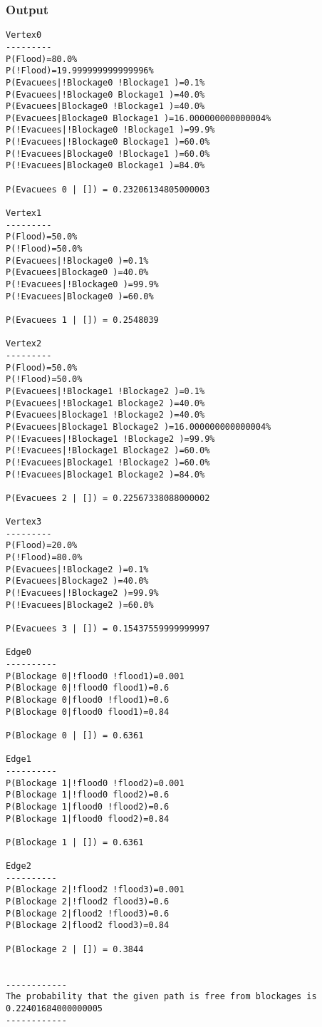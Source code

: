 \documentclass{article}                     %
\begin{document}
\subsubsection{Output}
\begin{verbatim}
Vertex0
---------
P(Flood)=80.0%
P(!Flood)=19.999999999999996%
P(Evacuees|!Blockage0 !Blockage1 )=0.1%
P(Evacuees|!Blockage0 Blockage1 )=40.0%
P(Evacuees|Blockage0 !Blockage1 )=40.0%
P(Evacuees|Blockage0 Blockage1 )=16.000000000000004%
P(!Evacuees|!Blockage0 !Blockage1 )=99.9%
P(!Evacuees|!Blockage0 Blockage1 )=60.0%
P(!Evacuees|Blockage0 !Blockage1 )=60.0%
P(!Evacuees|Blockage0 Blockage1 )=84.0%

P(Evacuees 0 | []) = 0.23206134805000003

Vertex1
---------
P(Flood)=50.0%
P(!Flood)=50.0%
P(Evacuees|!Blockage0 )=0.1%
P(Evacuees|Blockage0 )=40.0%
P(!Evacuees|!Blockage0 )=99.9%
P(!Evacuees|Blockage0 )=60.0%

P(Evacuees 1 | []) = 0.2548039

Vertex2
---------
P(Flood)=50.0%
P(!Flood)=50.0%
P(Evacuees|!Blockage1 !Blockage2 )=0.1%
P(Evacuees|!Blockage1 Blockage2 )=40.0%
P(Evacuees|Blockage1 !Blockage2 )=40.0%
P(Evacuees|Blockage1 Blockage2 )=16.000000000000004%
P(!Evacuees|!Blockage1 !Blockage2 )=99.9%
P(!Evacuees|!Blockage1 Blockage2 )=60.0%
P(!Evacuees|Blockage1 !Blockage2 )=60.0%
P(!Evacuees|Blockage1 Blockage2 )=84.0%

P(Evacuees 2 | []) = 0.22567338088000002

Vertex3
---------
P(Flood)=20.0%
P(!Flood)=80.0%
P(Evacuees|!Blockage2 )=0.1%
P(Evacuees|Blockage2 )=40.0%
P(!Evacuees|!Blockage2 )=99.9%
P(!Evacuees|Blockage2 )=60.0%

P(Evacuees 3 | []) = 0.15437559999999997

Edge0
----------
P(Blockage 0|!flood0 !flood1)=0.001
P(Blockage 0|!flood0 flood1)=0.6
P(Blockage 0|flood0 !flood1)=0.6
P(Blockage 0|flood0 flood1)=0.84

P(Blockage 0 | []) = 0.6361

Edge1
----------
P(Blockage 1|!flood0 !flood2)=0.001
P(Blockage 1|!flood0 flood2)=0.6
P(Blockage 1|flood0 !flood2)=0.6
P(Blockage 1|flood0 flood2)=0.84

P(Blockage 1 | []) = 0.6361

Edge2
----------
P(Blockage 2|!flood2 !flood3)=0.001
P(Blockage 2|!flood2 flood3)=0.6
P(Blockage 2|flood2 !flood3)=0.6
P(Blockage 2|flood2 flood3)=0.84

P(Blockage 2 | []) = 0.3844


------------
The probability that the given path is free from blockages is 0.22401684000000005
------------
\end{verbatim}
\end{document}

